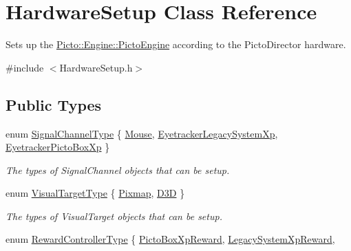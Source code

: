 \hypertarget{class_hardware_setup}{\section{Hardware\-Setup Class Reference}
\label{class_hardware_setup}
}


Sets up the \hyperlink{class_picto_1_1_engine_1_1_picto_engine}{Picto\-::\-Engine\-::\-Picto\-Engine} according to the Picto\-Director hardware.  




{\ttfamily \#include $<$Hardware\-Setup.\-h$>$}

\subsection*{Public Types}
\begin{DoxyCompactItemize}
\item 
enum \hyperlink{class_hardware_setup_a47f2dfba54bc1a8d0bbd64d885d638e6}{Signal\-Channel\-Type} \{ \hyperlink{class_hardware_setup_a47f2dfba54bc1a8d0bbd64d885d638e6aa0e71632c05842ebd76e1cf2d3e9d03e}{Mouse}, 
\hyperlink{class_hardware_setup_a47f2dfba54bc1a8d0bbd64d885d638e6aa37a374b7c5af662532c47532152ba7c}{Eyetracker\-Legacy\-System\-Xp}, 
\hyperlink{class_hardware_setup_a47f2dfba54bc1a8d0bbd64d885d638e6aa5092296cb0e9f4668e438ed9d126377}{Eyetracker\-Picto\-Box\-Xp}
 \}
\begin{DoxyCompactList}\small\item\em The types of Signal\-Channel objects that can be setup. \end{DoxyCompactList}\item 
enum \hyperlink{class_hardware_setup_a69c004a7774626593182bda8c88c1005}{Visual\-Target\-Type} \{ \hyperlink{class_hardware_setup_a69c004a7774626593182bda8c88c1005a907396ec61e0de7775ba86d887af5457}{Pixmap}, 
\hyperlink{class_hardware_setup_a69c004a7774626593182bda8c88c1005a902a819b8d83a0a4eaa612023f73539f}{D3\-D}
 \}
\begin{DoxyCompactList}\small\item\em The types of Visual\-Target objects that can be setup. \end{DoxyCompactList}\item 
enum \hyperlink{class_hardware_setup_adca8a1e846871351eea56002364cd9bf}{Reward\-Controller\-Type} \{ \hyperlink{class_hardware_setup_adca8a1e846871351eea56002364cd9bfabacd521b587da2841af42161a892fbcd}{Picto\-Box\-Xp\-Reward}, 
\hyperlink{class_hardware_setup_adca8a1e846871351eea56002364cd9bfad71ea9a5498fe8fd88fbfd472df00ec7}{Legacy\-System\-Xp\-Reward}, 

\end{DoxyCompactItemize}
